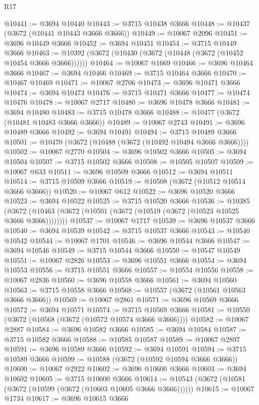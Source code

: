 \begin{lexlean}{R17}
\begin{coremodule}
@10441 := @3694 @10440
@10443 := @3715 @10438 @3666
@10448 := @10437 (@3672 (@10441 @10443 @3666 @3666))
@10449 := @10067 @2096
@10451 := @3696 @10449 @3666
@10452 := @3694 @10451
@10454 := @3715 @10449 @3666
@10463 := @10392 (@3672 (@10430 (@3672 (@10448 (@3672 (@10452 @10454 @3666 @3666))))))
@10464 := @10067 @1669
@10466 := @3696 @10464 @3666
@10467 := @3694 @10466
@10469 := @3715 @10464 @3666
@10470 := @10467 @10469
@10471 := @10067 @2706
@10473 := @3696 @10471 @3666
@10474 := @3694 @10473
@10476 := @3715 @10471 @3666
@10477 := @10474 @10476
@10478 := @10067 @2717
@10480 := @3696 @10478 @3666
@10481 := @3694 @10480
@10483 := @3715 @10478 @3666
@10488 := @10477 (@3672 (@10481 @10483 @3666 @3666))
@10489 := @10067 @2743
@10491 := @3696 @10489 @3666
@10492 := @3694 @10491
@10494 := @3715 @10489 @3666
@10501 := @10470 (@3672 (@10488 (@3672 (@10492 @10494 @3666 @3666))))
@10502 := @10067 @2770
@10504 := @3696 @10502 @3666
@10505 := @3694 @10504
@10507 := @3715 @10502 @3666
@10508 := @10505 @10507
@10509 := @10067 @633
@10511 := @3696 @10509 @3666
@10512 := @3694 @10511
@10514 := @3715 @10509 @3666
@10519 := @10508 (@3672 (@10512 @10514 @3666 @3666))
@10520 := @10067 @612
@10522 := @3696 @10520 @3666
@10523 := @3694 @10522
@10525 := @3715 @10520 @3666
@10536 := @10385
    (@3672 (@10463 (@3672 (@10501 (@3672 (@10519 (@3672 (@10523 @10525 @3666 @3666))))))))
@10537 := @10067 @1717
@10539 := @3696 @10537 @3666
@10540 := @3694 @10539
@10542 := @3715 @10537 @3666
@10543 := @10540 @10542
@10544 := @10067 @1701
@10546 := @3696 @10544 @3666
@10547 := @3694 @10546
@10549 := @3715 @10544 @3666
@10550 := @10547 @10549
@10551 := @10067 @2826
@10553 := @3696 @10551 @3666
@10554 := @3694 @10553
@10556 := @3715 @10551 @3666
@10557 := @10554 @10556
@10558 := @10067 @2836
@10560 := @3696 @10558 @3666
@10561 := @3694 @10560
@10563 := @3715 @10558 @3666
@10568 := @10557 (@3672 (@10561 @10563 @3666 @3666))
@10569 := @10067 @2861
@10571 := @3696 @10569 @3666
@10572 := @3694 @10571
@10574 := @3715 @10569 @3666
@10581 := @10550 (@3672 (@10568 (@3672 (@10572 @10574 @3666 @3666))))
@10582 := @10067 @2887
@10584 := @3696 @10582 @3666
@10585 := @3694 @10584
@10587 := @3715 @10582 @3666
@10588 := @10585 @10587
@10589 := @10067 @2897
@10591 := @3696 @10589 @3666
@10592 := @3694 @10591
@10594 := @3715 @10589 @3666
@10599 := @10588 (@3672 (@10592 @10594 @3666 @3666))
@10600 := @10067 @2922
@10602 := @3696 @10600 @3666
@10603 := @3694 @10602
@10605 := @3715 @10600 @3666
@10614 := @10543 (@3672 (@10581 (@3672 (@10599 (@3672 (@10603 @10605 @3666 @3666))))))
@10615 := @10067 @1734
@10617 := @3696 @10615 @3666

\end{coremodule}
\end{lexlean}
